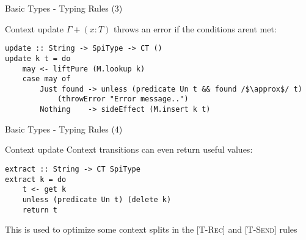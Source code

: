 \begin{frame}[fragile]{Basic Types - Typing Rules (3)}

    \begin{exampleblock}{Context update}
        $\Gamma + (x : T)$ throws an error if the conditions arent met:
        \small\begin{verbatim}
update :: String -> SpiType -> CT ()
update k t = do
    may <- liftPure (M.lookup k)
    case may of
        Just found -> unless (predicate Un t && found /$\approx$/ t) 
            (throwError "Error message..")
        Nothing    -> sideEffect (M.insert k t)
        \end{verbatim}
    \end{exampleblock}
    
\end{frame}


\begin{frame}[fragile]{Basic Types - Typing Rules (4)}

    \begin{exampleblock}{Context update}
        Context transitions can even return useful values:
        \small\begin{verbatim}
extract :: String -> CT SpiType
extract k = do
    t <- get k
    unless (predicate Un t) (delete k)
    return t
        \end{verbatim}
    \end{exampleblock}

    This is used to optimize some context splits in the [\textsc{T-Rec}] and [\textsc{T-Send}] rules

\end{frame}




